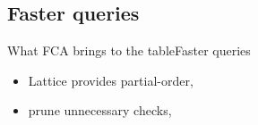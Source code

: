 %
\subsection{Faster queries}

\begin{frame}{What FCA brings to the table}{Faster queries}
    \begin{itemize}
      \item Lattice provides partial-order,
      \item prune unnecessary checks,
    \end{itemize}
\end{frame}

